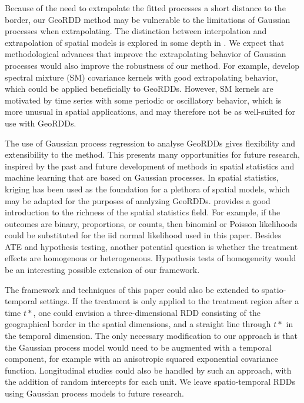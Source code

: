 \documentclass[letter]{article}
\renewcommand{\cite}[1]{\citet{#1}}
\begin{document}
Because of the need to extrapolate the fitted processes a short distance to the border, our GeoRDD method may be vulnerable to the limitations of Gaussian processes when extrapolating.
The distinction between interpolation and extrapolation of spatial models is explored in some depth in \cite{stein2012interpolation}.
We expect that methodological advances that improve the extrapolating behavior of Gaussian processes would also improve the robustness of our method.
For example, \cite{wilson2013gaussian} develop spectral mixture (SM) covariance kernels with good extrapolating behavior, which could be applied beneficially to GeoRDDs.
However, SM kernels are motivated by time series with some periodic or oscillatory behavior, which is more unusual in spatial applications, and may therefore not be as well-suited for use with GeoRDDs.
    


    	The use of Gaussian process regression to analyse GeoRDDs gives flexibility and extensibility to the method.
This presents many opportunities for future research, inspired by the past and future development of methods in spatial statistics and machine learning that are based on Gaussian processes.
In spatial statistics, kriging has been used as the foundation for a plethora of spatial models, which may be adapted for the purposes of analyzing GeoRDDs.
\cite{banerjee2014hierarchical} provides a good introduction to the richness of the spatial statistics field.
For example, if the outcomes are binary, proportions, or counts, then binomial or Poisson likelihoods could be substituted for the iid normal likelihood used in this paper.
Besides ATE and hypothesis testing, another potential question is whether the treatment effects are homogenous or heterogeneous.
Hypothesis tests of homogeneity would be an interesting possible extension of our framework.

The framework and techniques of this paper could also be extended to spatio-temporal settings.
If the treatment is only applied to the treatment region after a time \(t*\), one could envision a three-dimensional RDD consisting of the geographical border in the spatial dimensions, and a straight line through \(t*\) in the temporal dimension.
The only necessary modification to our approach is that the Gaussian process model would need to be augmented with a temporal component, for example with an anisotropic squared exponential covariance function.
Longitudinal studies could also be handled by such an approach, with the addition of random intercepts for each unit.
We leave spatio-temporal RDDs using Gaussian process models to future research.
    
\end{document}
